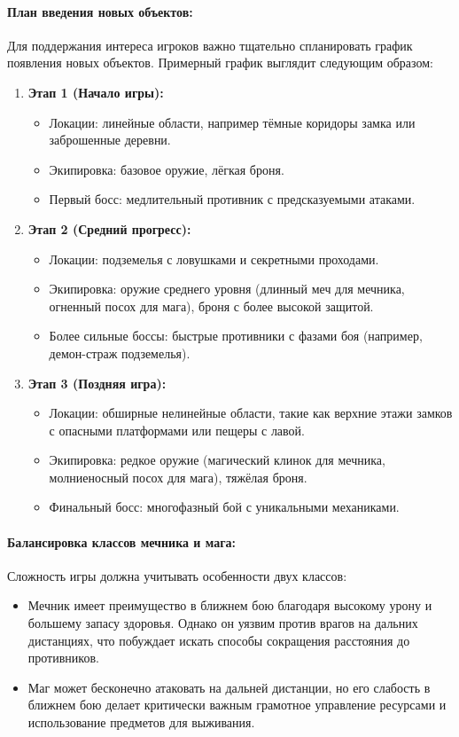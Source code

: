 \documentclass{article}
\begin{document}
\begin{itemize}
\paragraph{План введения новых объектов:}
Для поддержания интереса игроков важно тщательно спланировать график появления новых объектов. Примерный график выглядит следующим образом:
\begin{enumerate}
    \item \textbf{Этап 1 (Начало игры):}
    \begin{itemize}
        \item Локации: линейные области, например тёмные коридоры замка или заброшенные деревни.
        \item Экипировка: базовое оружие, лёгкая броня.
        \item Первый босс: медлительный противник с предсказуемыми атаками.
    \end{itemize}
    \item \textbf{Этап 2 (Средний прогресс):}
    \begin{itemize}
        \item Локации: подземелья с ловушками и секретными проходами.
        \item Экипировка: оружие среднего уровня (длинный меч для мечника, огненный посох для мага), броня с более высокой защитой.
        \item Более сильные боссы: быстрые противники с фазами боя (например, демон-страж подземелья).
    \end{itemize}
    \item \textbf{Этап 3 (Поздняя игра):}
    \begin{itemize}
        \item Локации: обширные нелинейные области, такие как верхние этажи замков с опасными платформами или пещеры с лавой.
        \item Экипировка: редкое оружие (магический клинок для мечника, молниеносный посох для мага), тяжёлая броня.
        \item Финальный босс: многофазный бой с уникальными механиками.
    \end{itemize}
\end{enumerate}

\paragraph{Балансировка классов мечника и мага:}
Сложность игры должна учитывать особенности двух классов:
\begin{itemize}
    \item Мечник имеет преимущество в ближнем бою благодаря высокому урону и большему запасу здоровья. Однако он уязвим против врагов на дальних дистанциях, что побуждает искать способы сокращения расстояния до противников.
    \item Маг может бесконечно атаковать на дальней дистанции, но его слабость в ближнем бою делает критически важным грамотное управление ресурсами и использование предметов для выживания.
\end{itemize}


\end{itemize}
\end{document}
